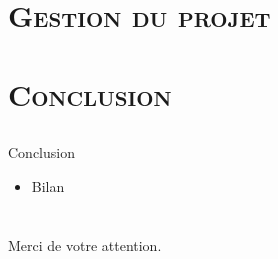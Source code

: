 \documentclass[xcolor=x11names,compress]{beamer}
\begin{document}
\begin{frame}

\end{frame}

\begin{frame}

\end{frame}

\begin{frame}

\end{frame}



\section{\scshape Gestion du projet}
\subsection{}


\begin{frame}

\end{frame}



\section{\scshape Conclusion}
\subsection{}

\begin{frame}{Conclusion}
	\begin{itemize}
		\item Bilan 
	\end{itemize}
\end{frame}


\section{}
\begin{frame}{}
	\vfill
	\begin{center}
		{\LARGE Merci de votre attention.}
	\end{center}
	\vfill
\end{frame}
\end{document}
